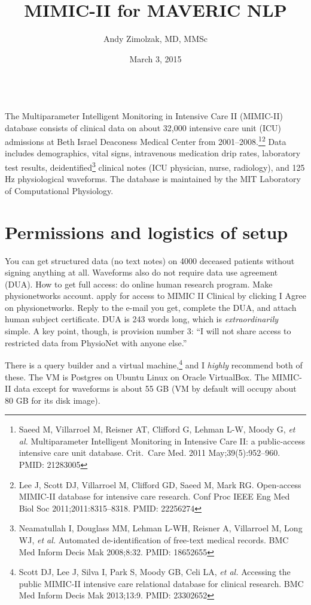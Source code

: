 \documentclass{tufte-handout}
\title{MIMIC-II for MAVERIC NLP}
\author{Andy Zimolzak, MD, MMSc}
\date{March 3, 2015}
\begin{document}
\maketitle

~\\

The Multiparameter Intelligent Monitoring in Intensive Care II
(MIMIC-II) database consists of clinical data on about 32,000
intensive care unit (ICU) admissions at Beth Israel Deaconess Medical
Center from 2001--2008.\footnote{Saeed M, Villarroel M, Reisner AT,
  Clifford G, Lehman L-W, Moody G, \emph{et al.} Multiparameter
  Intelligent Monitoring in Intensive Care II: a public-access
  intensive care unit database. Crit.\ Care Med. 2011
  May;39(5):952–960. PMID: 21283005}\footnote{Lee J, Scott DJ,
  Villarroel M, Clifford GD, Saeed M, Mark RG. Open-access MIMIC-II
  database for intensive care research. Conf Proc IEEE Eng Med Biol
  Soc 2011;2011:8315–8318. PMID: 22256274} Data includes demographics,
vital signs, intravenous medication drip rates, laboratory test
results, deidentified\footnote{Neamatullah I, Douglass MM, Lehman
  L-WH, Reisner A, Villarroel M, Long WJ, \emph{et al.} Automated
  de-identification of free-text medical records. BMC Med Inform Decis
  Mak 2008;8:32. PMID: 18652655 } clinical notes (ICU physician,
nurse, radiology), and 125 Hz physiological waveforms. The database is
maintained by the MIT Laboratory of Computational Physiology.

\section{Permissions and logistics of setup}

You can get structured data (no text notes) on 4000 deceased patients
without signing anything at all. Waveforms also do not require data
use agreement (DUA). How to get full access: do online human research
program. Make physionetworks account. apply for access to MIMIC II
Clinical by clicking I Agree on physionetworks. Reply to the e-mail
you get, complete the DUA, and attach human subject certificate. DUA
is 243 words long, which is \emph{extraordinarily} simple. A key
point, though, is provision number 3: ``I will not share access to
restricted data from PhysioNet with anyone else.''

There is a query builder and a virtual machine,\footnote{Scott DJ, Lee
  J, Silva I, Park S, Moody GB, Celi LA, \emph{et al.} Accessing the
  public MIMIC-II intensive care relational database for clinical
  research. BMC Med Inform Decis Mak 2013;13:9. PMID: 23302652 } and I
\emph{highly} recommend both of these. The VM is Postgres on Ubuntu
Linux on Oracle VirtualBox. The MIMIC-II data except for waveforms is
about 55 GB (VM by default will occupy about 80 GB for its disk
image).
\end{document}
